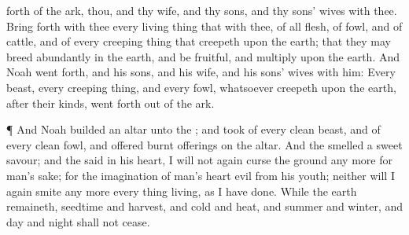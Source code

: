 {forth of the
ark, thou, and thy
wife, and thy
sons, and thy
sons’
wives with thee.
Bring
forth with thee every living
thing that
{} with thee, of all
flesh,
{} of
fowl, and of
cattle, and of every creeping
thing that
creepeth upon the
earth; that they may breed
abundantly in the
earth, and be
fruitful, and
multiply upon the
earth.
And
Noah went
forth, and his
sons, and his
wife, and his
sons’
wives with him:
Every
beast, every creeping
thing, and every
fowl,
{}
whatsoever
creepeth upon the
earth, after their
kinds, went
forth out of the
ark.
\par }{\PP {}¶ And
Noah
builded an
altar unto the
{}; and
took of every
clean
beast, and of every
clean
fowl, and
offered burnt
offerings on the
altar.
And the
{}
smelled a
sweet
savour; and the
{}
said
in his
heart, I will not
again
curse the
ground any more for
man’s
sake; for the
imagination of
man’s
heart
{}
evil from his
youth; neither will I
again
smite any more every thing
living, as I have
done.
While the
earth
remaineth,
seedtime and
harvest, and
cold and
heat, and
summer and
winter, and
day and
night shall not
cease.

}
